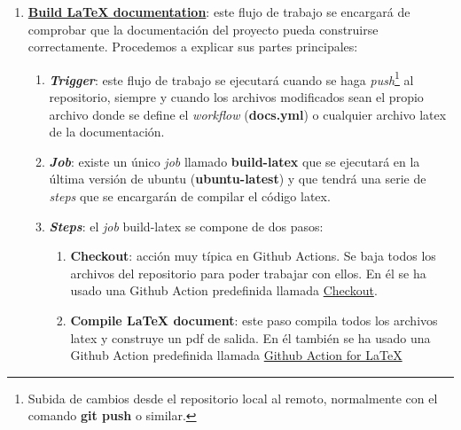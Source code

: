     \begin{enumerate}
        \item \textbf{\href{https://github.com/alexespana/TFG/actions/workflows/docs.yml}
        {Build LaTeX documentation}}: este flujo de trabajo se encargará de comprobar que
        la documentación del proyecto pueda construirse correctamente. Procedemos a
        explicar sus partes principales:
            \begin{enumerate}
                \item \textbf{\textit{Trigger}}: este flujo de trabajo se ejecutará cuando
                se haga \textit{push}\footnote{Subida de cambios desde el repositorio local
                al remoto, normalmente con el comando \textbf{git push} o similar.} al
                repositorio, siempre y cuando los archivos modificados sean el propio
                archivo donde se define el \textit{workflow} (\textbf{docs.yml}) o cualquier
                archivo latex de la documentación.
                \item \textbf{\textit{Job}}: existe un único \textit{job} llamado
                \textbf{build-latex} que se ejecutará en la última versión de ubuntu
                (\textbf{ubuntu-latest}) y que tendrá una serie de \textit{steps} que se
                encargarán de compilar el código latex.
                \item \textbf{\textit{Steps}}: el \textit{job} build-latex se compone de dos
                pasos:
                    \begin{enumerate}
                        \item \textbf{Checkout}: acción muy típica en Github Actions. Se baja
                        todos los archivos del repositorio para poder trabajar con ellos. En
                        él se ha usado una Github Action predefinida llamada
                        \href{https://github.com/marketplace/actions/checkout}{Checkout}.
                        \item \textbf{Compile LaTeX document}: este paso compila todos los
                        archivos latex y construye un pdf de salida. En él también se ha
                        usado una Github Action predefinida llamada
                        \href{https://github.com/marketplace/actions/github-action-for-latex}
                        {Github Action for LaTeX}
                    \end{enumerate}
            \end{enumerate}


\end{enumerate}
